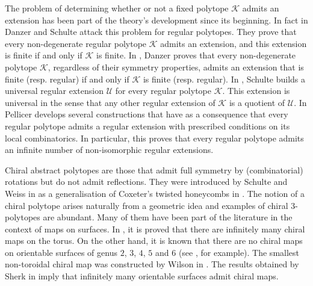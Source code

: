 \documentclass[final]{amsart}
\theoremstyle{plain}
\theoremstyle{definition}
\theoremstyle{remark}
\numberwithin{equation}{section}
\renewcommand{\{}{\lbrace}
\renewcommand{\}}{\rbrace}
\newcommand{\cK}{\mathcal{K}}
\newcommand{\cU}{\mathcal{U}}
\begin{document}
The problem of determining whether or not a fixed polytope $\cK$ admits an extension has been part of the theory's development since its beginning. In fact in \cite{DanzerSchulte_1982_RegulareInzidenzkomplexe.I} Danzer and Schulte attack this problem for regular polytopes. 
They prove that every non-degenerate regular polytope $\cK$ admits an extension, and this extension is finite if and only if $\cK$ is finite. In \cite{Danzer_1984_RegularIncidenceComplexes}, Danzer proves that every non-degenerate polytope $\cK$, regardless of their symmetry properties, admits an extension that is finite (resp. regular) if and only if $\cK$ is finite (resp. regular). 
In \cite{Schulte_1983_ArrangingRegularIncidence}, Schulte builds a universal regular extension $\cU$ for every regular polytope $\cK$. 
This extension is universal in the sense that any other regular extension of $\cK$ is a quotient of $\cU$. 
In \cite{Pellicer_2009_ExtensionsRegularPolytopes,Pellicer_2010_ExtensionsDuallyBipartite} Pellicer develops several constructions that have as a consequence that every regular polytope admits a regular extension with prescribed conditions on its local combinatorics. 
In particular, this proves that every regular polytope admits an infinite number of non-isomorphic regular extensions.

Chiral abstract polytopes are those that admit full symmetry by (combinatorial) rotations but do not admit reflections.
They were introduced by Schulte and Weiss in \cite{SchulteWeiss_1991_ChiralPolytopes} as a generalisation of Coxeter's twisted honeycombs in \cite{Coxeter_1970_TwistedHoneycombs}.
The notion of a chiral polytope arises naturally from a geometric idea and examples of chiral $3$-polytopes are abundant. 
Many of them have been part of the literature in the context of maps on surfaces.
In \cite{CoxeterMoser_1972_GeneratorsRelationsDiscrete}, it is proved that there are infinitely many chiral maps on the torus. 
On the other hand, it is known that there are no chiral maps on orientable surfaces of genus $2$, $3$, $4$, $5$ and $6$ (see \cite{ConderDobcsanyi_2001_DeterminationAllRegular, Garbe_1969_UberDieRegularen}, for example). 
The smallest non-toroidal chiral map was constructed by Wilson in \cite{Wilson_1978_SmallestNontoroidalChiral}. 
The results obtained by Sherk in \cite{Sherk_1962_FamilyRegularMaps} imply that infinitely many orientable surfaces admit chiral maps. 
\end{document}
